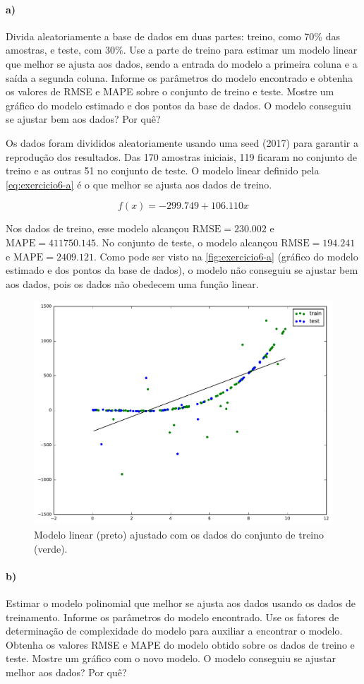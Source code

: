 \documentclass{article}
\begin{document}
\paragraph{a)} Divida aleatoriamente a base de dados em duas partes: treino, como 70\% das amostras, e teste, com 30\%. Use a parte de treino para estimar um modelo linear que melhor se ajusta aos dados, sendo a entrada do modelo a primeira coluna e a saída a segunda coluna. Informe os parâmetros do modelo encontrado e obtenha os valores de RMSE e MAPE sobre o conjunto de treino e teste. Mostre um gráfico do modelo estimado e dos pontos da base de dados. O modelo conseguiu se ajustar bem aos dados? Por quê?

Os dados foram divididos aleatoriamente usando uma seed (2017) para garantir a reprodução dos resultados. Das 170 amostras iniciais, 119 ficaram no conjunto de treino e as outras 51 no conjunto de teste. O modelo linear definido pela \autoref{eq:exercicio6-a} é o que melhor se ajusta aos dados de treino.

\begin{equation}
\label{eq:exercicio6-a}
f(x) = -299.749 + 106.110x
\end{equation}

Nos dados de treino, esse modelo alcançou $\mathrm{RMSE} = 230.002$ e $\mathrm{MAPE} = 411750.145$. No conjunto de teste, o modelo alcançou $\mathrm{RMSE} = 194.241$ e $\mathrm{MAPE} = 2409.121$. Como pode ser visto na \autoref{fig:exercicio6-a} (gráfico do modelo estimado e dos pontos da base de dados), o modelo não conseguiu se ajustar bem aos dados, pois os dados não obedecem uma função linear.

\begin{figure}[h]
	\centering
	\includegraphics[width=0.5\linewidth]{exercicio6-a.pdf}
	\caption{Modelo linear (preto) ajustado com os dados do conjunto de treino (verde).}
	\label{fig:exercicio6-a}
\end{figure}

\paragraph{b)} Estimar o modelo polinomial que melhor se ajusta aos dados usando os dados de treinamento. Informe os parâmetros do modelo encontrado. Use os fatores de determinação de complexidade do modelo para auxiliar a encontrar o modelo. Obtenha os valores RMSE e MAPE do modelo obtido sobre os dados de treino e teste. Mostre um gráfico com o novo modelo. O modelo conseguiu se ajustar melhor aos dados? Por quê?
\end{document}
